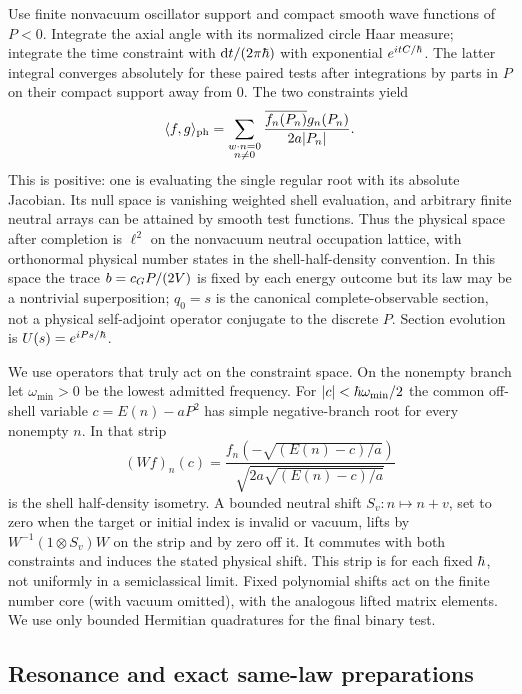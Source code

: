 Use finite nonvacuum oscillator support and compact smooth wave functions of \(P<0\). Integrate the axial angle with its normalized circle Haar measure; integrate the time constraint with \(\mathrm d t/(2\pi\hbar)\) with exponential \(e^{itC/\hbar}\). The latter integral converges absolutely for these paired tests after integrations by parts in \(P\) on their compact support away from \(0\). The two constraints yield
\begin{equation}\label{eq:rigging}
 \langle f,g\rangle_{\rm ph}
   =\sum_{\substack{w\cdot n=0\\ n\ne0}}
         \frac{\overline{f_n(P_n)}g_n(P_n)}{2a|P_n|}.
\end{equation}
This is positive: one is evaluating the single regular root with its absolute Jacobian. Its null space is vanishing weighted shell evaluation, and arbitrary finite neutral arrays can be attained by smooth test functions. Thus the physical space after completion is \(\ell^2\) on the nonvacuum neutral occupation lattice, with orthonormal physical number states in the shell-half-density convention. In this space the trace \(b=c_G P/(2V)\) is fixed by each energy outcome but its law may be a nontrivial superposition; \(q_0=s\) is the canonical complete-observable section, not a physical self-adjoint operator conjugate to the discrete \(P\). Section evolution is \(U(s)=e^{iPs/\hbar}\).

We use operators that truly act on the constraint space. On the nonempty branch let \(\omega_{\min}>0\) be the lowest admitted frequency. For \(|c|<\hbar\omega_{\min}/2\) the common off-shell variable \(c=E(n)-aP^2\) has simple negative-branch root for every nonempty \(n\). In that strip
\[
    (Wf)_n(c)=
      \frac{ f_n(-\sqrt{(E(n)-c)/a})}
                 {\sqrt{2a\sqrt{(E(n)-c)/a}}}
\]
is the shell half-density isometry. A bounded neutral shift \(S_v:n\mapsto n+v\), set to zero when the target or initial index is invalid or vacuum, lifts by \(W^{-1}(1\otimes S_v)W\) on the strip and by zero off it. It commutes with both constraints and induces the stated physical shift. This strip is for each fixed \(\hbar\), not uniformly in a semiclassical limit. Fixed polynomial shifts act on the finite number core (with vacuum omitted), with the analogous lifted matrix elements. We use only bounded Hermitian quadratures for the final binary test.

\subsection{Resonance and exact same-law preparations}

